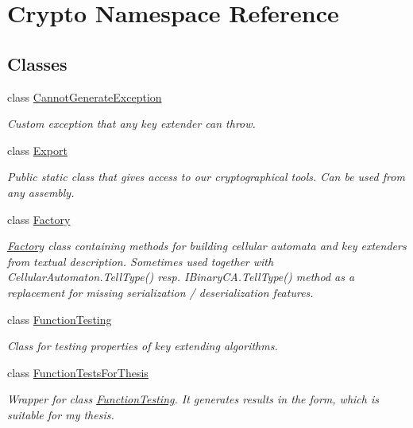\hypertarget{namespace_crypto}{}\section{Crypto Namespace Reference}
\label{namespace_crypto}
\subsection*{Classes}
\begin{DoxyCompactItemize}
\item 
class \hyperlink{class_crypto_1_1_cannot_generate_exception}{Cannot\+Generate\+Exception}
\begin{DoxyCompactList}\small\item\em Custom exception that any key extender can throw. \end{DoxyCompactList}\item 
class \hyperlink{class_crypto_1_1_export}{Export}
\begin{DoxyCompactList}\small\item\em Public static class that gives access to our cryptographical tools. Can be used from any assembly. \end{DoxyCompactList}\item 
class \hyperlink{class_crypto_1_1_factory}{Factory}
\begin{DoxyCompactList}\small\item\em \hyperlink{class_crypto_1_1_factory}{Factory} class containing methods for building cellular automata and key extenders from textual description. Sometimes used together with {\ttfamily Cellular\+Automaton.\+Tell\+Type()} resp. {\ttfamily I\+Binary\+C\+A.\+Tell\+Type()} method as a replacement for missing serialization / deserialization features. \end{DoxyCompactList}\item 
class \hyperlink{class_crypto_1_1_function_testing}{Function\+Testing}
\begin{DoxyCompactList}\small\item\em Class for testing properties of key extending algorithms. \end{DoxyCompactList}\item 
class \hyperlink{class_crypto_1_1_function_tests_for_thesis}{Function\+Tests\+For\+Thesis}
\begin{DoxyCompactList}\small\item\em Wrapper for class {\ttfamily \hyperlink{class_crypto_1_1_function_testing}{Function\+Testing}}. It generates results in the form, which is suitable for my thesis. \end{DoxyCompactList}\item 

\end{DoxyCompactItemize}
